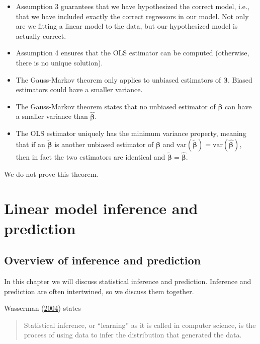 \documentclass[
]{book}
\providecommand{\tightlist}{%
  \setlength{\itemsep}{0pt}\setlength{\parskip}{0pt}}
\theoremstyle{definition}
\theoremstyle{definition}
\theoremstyle{definition}
\theoremstyle{definition}
\theoremstyle{remark}
\begin{document}
\begin{itemize}
\tightlist
\item
  Assumption 3 guarantees that we have hypothesized the correct model, i.e., that we have included exactly the correct regressors in our model. Not only are we fitting a linear model to the data, but our hypothesized model is actually correct.
\item
  Assumption 4 ensures that the OLS estimator can be computed (otherwise, there is no unique solution).
\item
  The Gauss-Markov theorem only applies to unbiased estimators of \(\boldsymbol{\beta}\). Biased estimators could have a smaller variance.
\item
  The Gauss-Markov theorem states that no unbiased estimator of \(\boldsymbol{\beta}\) can have a smaller variance than \(\hat{\boldsymbol{\beta}}\).
\item
  The OLS estimator uniquely has the minimum variance property, meaning that if an \(\tilde{\boldsymbol{\beta}}\) is another unbiased estimator of \(\boldsymbol{\beta}\) and \(\mathrm{var}(\tilde{\boldsymbol{\beta}}) = \mathrm{var}(\hat{\boldsymbol{\beta}})\), then in fact the two estimators are identical and \(\tilde{\boldsymbol{\beta}}=\hat{\boldsymbol{\beta}}\).
\end{itemize}

We do not prove this theorem.

\hypertarget{inference}{%
\chapter{Linear model inference and prediction}\label{inference}}

\hypertarget{overview-of-inference-and-prediction}{%
\section{Overview of inference and prediction}\label{overview-of-inference-and-prediction}}

In this chapter we will discuss statistical inference and prediction. Inference and prediction are often intertwined, so we discuss them together.

Wasserman (\protect\hyperlink{ref-wasserman2004all}{2004}) states

\begin{quote}
Statistical inference, or ``learning'' as it is called in computer science, is the process of using data to infer the distribution that generated the data.
\end{quote}
\end{document}
